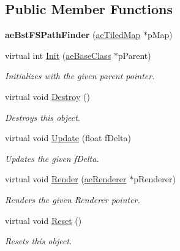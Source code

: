 \subsection*{Public Member Functions}
\begin{DoxyCompactItemize}
\item 
{\bfseries ae\+Bst\+F\+S\+Path\+Finder} (\hyperlink{classae_tiled_map}{ae\+Tiled\+Map} $\ast$p\+Map)\hypertarget{classae_bst_f_s_path_finder_a9f7b5e5aaa29bfe2502186fa46101df6}{}\label{classae_bst_f_s_path_finder_a9f7b5e5aaa29bfe2502186fa46101df6}

\item 
virtual int \hyperlink{classae_bst_f_s_path_finder_a83e0028b1394744dc56b703532a88b40}{Init} (\hyperlink{classae_base_class}{ae\+Base\+Class} $\ast$p\+Parent)
\begin{DoxyCompactList}\small\item\em Initializes with the given parent pointer. \end{DoxyCompactList}\item 
virtual void \hyperlink{classae_bst_f_s_path_finder_a9d9c30e5ce6cf6b00792ef59dbaef8b9}{Destroy} ()\hypertarget{classae_bst_f_s_path_finder_a9d9c30e5ce6cf6b00792ef59dbaef8b9}{}\label{classae_bst_f_s_path_finder_a9d9c30e5ce6cf6b00792ef59dbaef8b9}

\begin{DoxyCompactList}\small\item\em Destroys this object. \end{DoxyCompactList}\item 
virtual void \hyperlink{classae_bst_f_s_path_finder_a27dd4200f183349f605407278de0d086}{Update} (float f\+Delta)
\begin{DoxyCompactList}\small\item\em Updates the given f\+Delta. \end{DoxyCompactList}\item 
virtual void \hyperlink{classae_bst_f_s_path_finder_a6c3646502a67f145cd849392918b4c4b}{Render} (\hyperlink{classae_core_1_1ae_renderer}{ae\+Renderer} $\ast$p\+Renderer)
\begin{DoxyCompactList}\small\item\em Renders the given Renderer pointer. \end{DoxyCompactList}\item 
virtual void \hyperlink{classae_bst_f_s_path_finder_a31dcc8f08f56766c97b9054340faaaec}{Reset} ()\hypertarget{classae_bst_f_s_path_finder_a31dcc8f08f56766c97b9054340faaaec}{}\label{classae_bst_f_s_path_finder_a31dcc8f08f56766c97b9054340faaaec}

\begin{DoxyCompactList}\small\item\em Resets this object. \end{DoxyCompactList}\end{DoxyCompactItemize}
